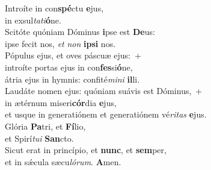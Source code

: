 \evenverse Introíte in con\textbf{spé}ctu \textbf{e}jus,~\*\\
\evenverse in exsul\textit{ta}\textit{ti}\textbf{ó}ne.\\
\oddverse Scitóte quóniam Dóminus \textbf{i}pse est \textbf{De}us:~\*\\
\oddverse ipse fecit nos, \textit{et} \textit{non} \textbf{i}\textbf{psi} nos.\\
\evenverse Pópulus ejus, et oves páscuæ ejus:~+\\
\evenverse  introíte portas ejus in con\textbf{fes}si\textbf{ó}ne,~\*\\
\evenverse átria ejus in hymnis: confité\textit{mi}\textit{ni} \textbf{il}li.\\
\oddverse Laudáte nomen ejus: quóniam suávis est Dóminus,~+\\
\oddverse  in ætérnum miseri\textbf{cór}dia \textbf{e}jus,~\*\\
\oddverse et usque in generatiónem et generatiónem vé\textit{ri}\textit{tas} \textbf{e}jus.\\
\evenverse Glória \textbf{Pa}tri, et \textbf{Fí}lio,~\*\\
\evenverse et Spirí\textit{tu}\textit{i} \textbf{San}cto.\\
\oddverse Sicut erat in princípio, et \textbf{nunc}, et \textbf{sem}per,~\*\\
\oddverse et in sǽcula sæcu\textit{ló}\textit{rum}. \textbf{A}men.\\
